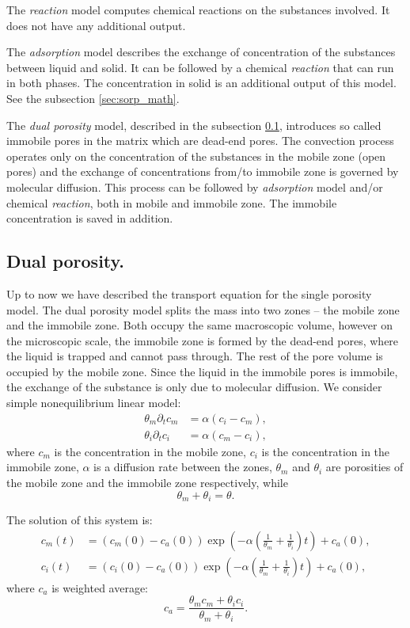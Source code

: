 The \emph{reaction} model computes chemical reactions on the substances involved. It does not have any additional output.

The \emph{adsorption} model describes the exchange of concentration of the substances between liquid and solid. It can be
followed by a chemical \emph{reaction} that can run in both phases. The concentration in solid is an additional output 
of this model. See the subsection \ref{sec:sorp_math}.


The \emph{dual porosity} model, described in the subsection \ref{sec:dual_porosity}, introduces so called immobile pores in the matrix
which are dead-end pores. The convection process operates only on the concentration of the substances in the mobile zone (open pores) 
and the exchange of concentrations from/to immobile zone is governed by molecular diffusion. This process can be followed by 
\emph{adsorption} model and/or chemical \emph{reaction}, both in mobile and immobile zone. The immobile concentration is saved
in addition.


\subsection{Dual porosity.}
\label{sec:dual_porosity}

Up to now we have described the transport equation for the single porosity model. The dual porosity model splits the mass into two zones -- the mobile zone and the immobile zone. 
Both occupy the same macroscopic volume, however on the microscopic scale, the immobile zone is formed by the dead-end pores, where the liquid is trapped and cannot pass through.
The rest of the pore volume is occupied by the mobile zone. Since the liquid in the immobile pores is immobile, the exchange of the substance is only due to molecular diffusion.
We consider simple nonequilibrium linear model:
\begin{align}
    \theta_m \partial_t c_m &= \alpha ( c_i - c_m), \\
    \theta_i \partial_t c_i &= \alpha ( c_m - c_i), 
\end{align}
where $c_m$ is the concentration in the mobile zone, $c_i$ is the concentration in the immobile zone, $\alpha$ is a diffusion rate between the zones, $\theta_m$ and $\theta_i$ are porosities of the mobile zone and the immobile zone respectively, while 
\[
  \theta_m +\theta_i =\theta.
\]

The solution of this system is:
\begin{align}
     c_m(t) &= (c_m(0) - c_a(0)) \exp\left(- \alpha\left(\frac{1}{\theta_m} + \frac{1}{\theta_i}\right) t \right) + c_a(0), \\
     c_i(t) &= (c_i(0) - c_a(0)) \exp\left(- \alpha\left(\frac{1}{\theta_m} + \frac{1}{\theta_i}\right) t \right) + c_a(0),
\end{align}
where $c_a$ is weighted average:
\[
  c_a = \frac{\theta_m c_m + \theta_i c_i}{\theta_m + \theta_i}.
\]


